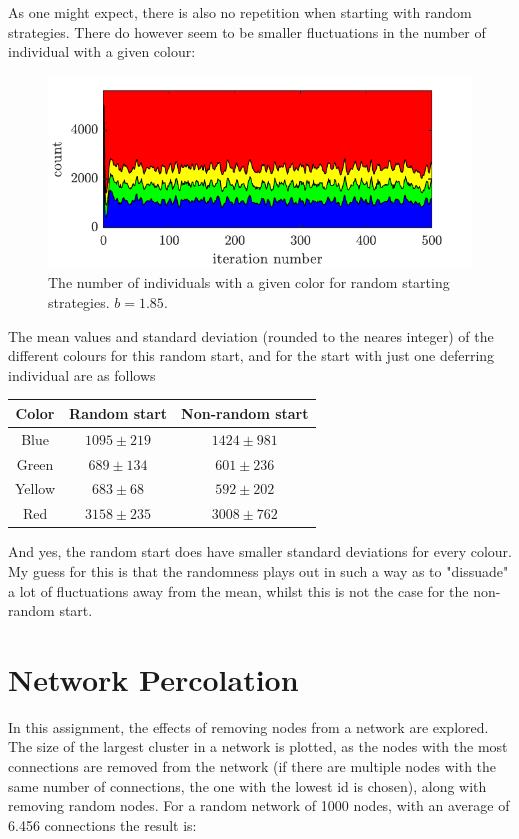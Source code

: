 \documentclass[a4paper,10pt]{article} 	%
\numberwithin{equation}{section}
\begin{document}
	As one might expect, there is also no repetition when starting with random strategies. There do however seem to be smaller fluctuations in the number of individual with a given colour:
	\begin{figure}[H]
		\centering
		\includegraphics[width=0.75\linewidth]{prisonercountRand}
		\caption{The number of individuals with a given color for random starting strategies. $ b = 1.85 $.}
		\label{fig:countRand}
	\end{figure}
	The mean values and standard deviation (rounded to the neares integer) of the different colours for this random start, and for the start with just one deferring individual are as follows
	\begin{table}[H]
		\centering
		\begin{tabular}{c|c|c}
			Color & Random start & Non-random start \\
			\hline
			Blue 	& $ 1095 \pm 219 $	& $ 1424 \pm 981 $\\
			Green 	& $ 689 \pm 134 $	& $ 601 \pm 236 $\\
			Yellow 	& $ 683 \pm 68 $	& $ 592 \pm 202 $\\
			Red 	& $ 3158 \pm 235 $	& $ 3008 \pm 762 $
		\end{tabular}
	\end{table}
	And yes, the random start does have smaller standard deviations for every colour. My guess for this is that the randomness plays out in such a way as to "dissuade" a lot of fluctuations away from the mean, whilst this is not the case for the non-random start.

	
	\section{Network Percolation}
	In this assignment, the effects of removing nodes from a network are explored. The size of the largest cluster in a network is plotted, as the nodes with the most connections are removed from the network (if there are multiple nodes with the same number of connections, the one with the lowest id is chosen), along with removing random nodes. For a random network of 1000 nodes, with an average of 6.456 connections the result is:
	
\end{document}
